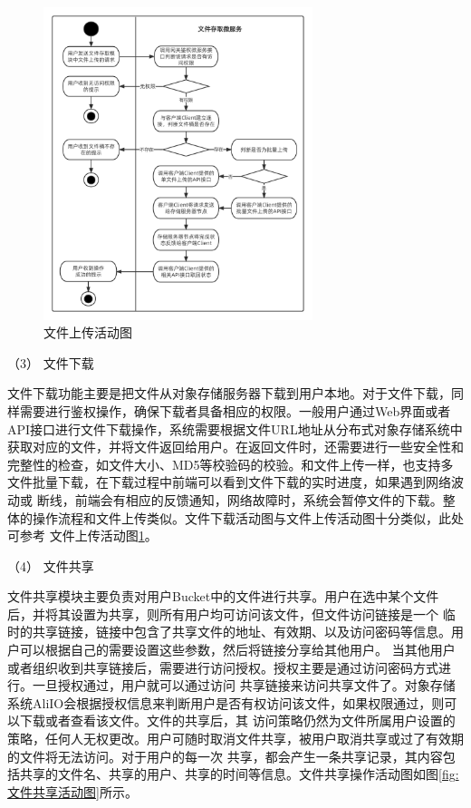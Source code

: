 \begin{figure}[htb]
    \centering
    \includegraphics[width=0.7\textwidth]{my_figures/chapter4/文件上传活动图.png}
    \caption{文件上传活动图}
    \label{fig:文件上传活动图}
\end{figure}

（3） 文件下载


文件下载功能主要是把文件从对象存储服务器下载到用户本地。对于文件下载，同样需要进行鉴权操作，确保下载者具备相应的权限。一般用户通过Web界面或者
API接口进行文件下载操作，系统需要根据文件URL地址从分布式对象存储系统中获取对应的文件，并将文件返回给用户。在返回文件时，还需要进行一些安全性和
完整性的检查，如文件大小、MD5等校验码的校验。和文件上传一样，也支持多文件批量下载，在下载过程中前端可以看到文件下载的实时进度，如果遇到网络波动或
断线，前端会有相应的反馈通知，网络故障时，系统会暂停文件的下载。整体的操作流程和文件上传类似。文件下载活动图与文件上传活动图十分类似，此处可参考
文件上传活动图\ref{fig:文件上传活动图}。


（4） 文件共享

文件共享模块主要负责对用户Bucket中的文件进行共享。用户在选中某个文件后，并将其设置为共享，则所有用户均可访问该文件，但文件访问链接是一个
临时的共享链接，链接中包含了共享文件的地址、有效期、以及访问密码等信息。用户可以根据自己的需要设置这些参数，然后将链接分享给其他用户。
当其他用户或者组织收到共享链接后，需要进行访问授权。授权主要是通过访问密码方式进行。一旦授权通过，用户就可以通过访问
共享链接来访问共享文件了。对象存储系统AliIO会根据授权信息来判断用户是否有权访问该文件，如果权限通过，则可以下载或者查看该文件。文件的共享后，其
访问策略仍然为文件所属用户设置的策略，任何人无权更改。用户可随时取消文件共享，被用户取消共享或过了有效期的文件将无法访问。对于用户的每一次
共享，都会产生一条共享记录，其内容包括共享的文件名、共享的用户、共享的时间等信息。文件共享操作活动图如图\ref{fig:文件共享活动图}所示。

